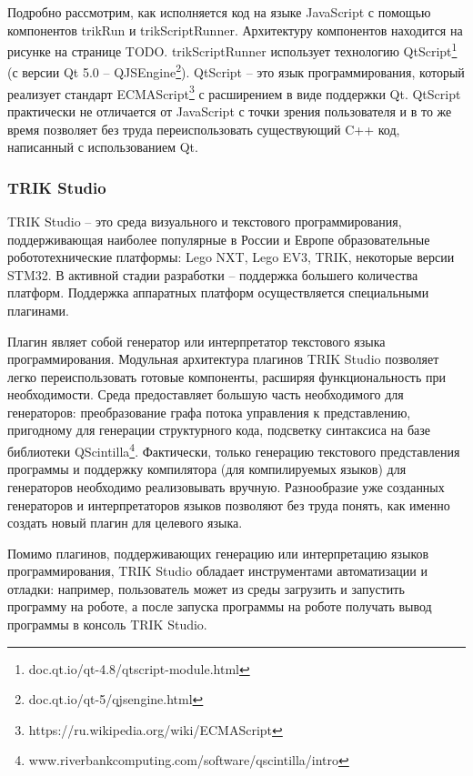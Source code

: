 \documentclass[14pt]{matmex-diploma-custom}
\begin{document}

Подробно рассмотрим, как исполняется код на языке JavaScript с помощью компонентов trikRun и trikScriptRunner. Архитектуру компонентов находится на рисунке на странице TODO. trikScriptRunner использует технологию QtScript\footnote{doc.qt.io/qt-4.8/qtscript-module.html} (с версии Qt 5.0 -- QJSEngine\footnote{doc.qt.io/qt-5/qjsengine.html}). QtScript -- это язык программирования, который реализует стандарт ECMAScript\footnote{https://ru.wikipedia.org/wiki/ECMAScript} с расширением в виде поддержки Qt. QtScript практически не отличается от JavaScript с точки зрения пользователя и в то же время позволяет без труда переиспользовать существующий C++ код, написанный с использованием Qt. 

\subsubsection{TRIK Studio}
TRIK Studio -- это среда визуального и текстового программирования, поддерживающая наиболее популярные в России и Европе образовательные робототехнические платформы: Lego NXT, Lego EV3, TRIK, некоторые версии STM32. В активной стадии разработки -- поддержка большего количества платформ. Поддержка аппаратных платформ осуществляется специальными плагинами. 

Плагин являет собой генератор или интерпретатор текстового языка программирования. Модульная архитектура плагинов TRIK Studio позволяет легко переиспользовать готовые компоненты, расширяя функциональность при необходимости. Среда предоставляет большую часть необходимого для генераторов: преобразование графа потока управления к представлению, пригодному для генерации структурного кода, подсветку синтаксиса на базе библиотеки QScintilla\footnote{www.riverbankcomputing.com/software/qscintilla/intro}. Фактически, только генерацию текстового представления программы и поддержку компилятора (для компилируемых языков) для генераторов необходимо реализовывать вручную. Разнообразие уже созданных генераторов и интерпретаторов языков позволяют без труда понять, как именно создать новый плагин для целевого языка.

Помимо плагинов, поддерживающих генерацию или интерпретацию языков программирования, TRIK Studio обладает инструментами автоматизации и отладки: например, пользователь может из среды загрузить и запустить программу на роботе, а после запуска программы на роботе получать вывод программы в консоль TRIK Studio.
\end{document}
